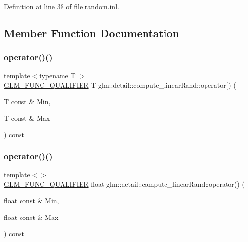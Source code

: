 Definition at line 38 of file random.\+inl.



\subsection{Member Function Documentation}
\mbox{\label{structglm_1_1detail_1_1compute__linear_rand_a8bdfdda9918e9353db9c32adc79a5c5c}} 
\subsubsection{\texorpdfstring{operator()()}{operator()()}\hspace{0.1cm}{\footnotesize\ttfamily [1/4]}}
{\footnotesize\ttfamily template$<$typename T $>$ \\
\hyperlink{setup_8hpp_a33fdea6f91c5f834105f7415e2a64407}{G\+L\+M\+\_\+\+F\+U\+N\+C\+\_\+\+Q\+U\+A\+L\+I\+F\+I\+ER} T glm\+::detail\+::compute\+\_\+linear\+Rand\+::operator() (\begin{DoxyParamCaption}\item[{T const \&}]{Min,  }\item[{T const \&}]{Max }\end{DoxyParamCaption}) const}

\mbox{\label{structglm_1_1detail_1_1compute__linear_rand_af2111416ac6f865878fd3b76e67b84e0}} 
\subsubsection{\texorpdfstring{operator()()}{operator()()}\hspace{0.1cm}{\footnotesize\ttfamily [2/4]}}
{\footnotesize\ttfamily template$<$$>$ \\
\hyperlink{setup_8hpp_a33fdea6f91c5f834105f7415e2a64407}{G\+L\+M\+\_\+\+F\+U\+N\+C\+\_\+\+Q\+U\+A\+L\+I\+F\+I\+ER} float glm\+::detail\+::compute\+\_\+linear\+Rand\+::operator() (\begin{DoxyParamCaption}\item[{float const \&}]{Min,  }\item[{float const \&}]{Max }\end{DoxyParamCaption}) const}



